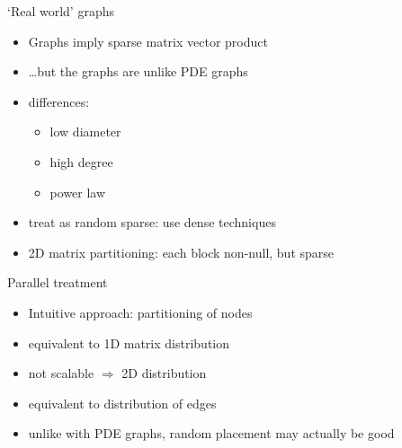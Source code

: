 \begin{numberedframe}{`Real world' graphs}
  \begin{itemize}
  \item Graphs imply sparse matrix vector product
  \item \ldots but the graphs are unlike PDE graphs
  \item differences:
    \begin{itemize}
    \item low diameter \item high degree \item power law
    \end{itemize}
  \item treat as random sparse: use dense techniques
  \item 2D matrix partitioning: each block non-null, but sparse
  \end{itemize}  
\end{numberedframe}

\begin{numberedframe}{Parallel treatment}
  \begin{itemize}
  \item Intuitive approach: partitioning of nodes
  \item equivalent to 1D matrix distribution
  \item not scalable $\Rightarrow$ 2D distribution
  \item equivalent to distribution of edges
  \item unlike with PDE graphs, random placement may actually be good
  \end{itemize}
\end{numberedframe}

